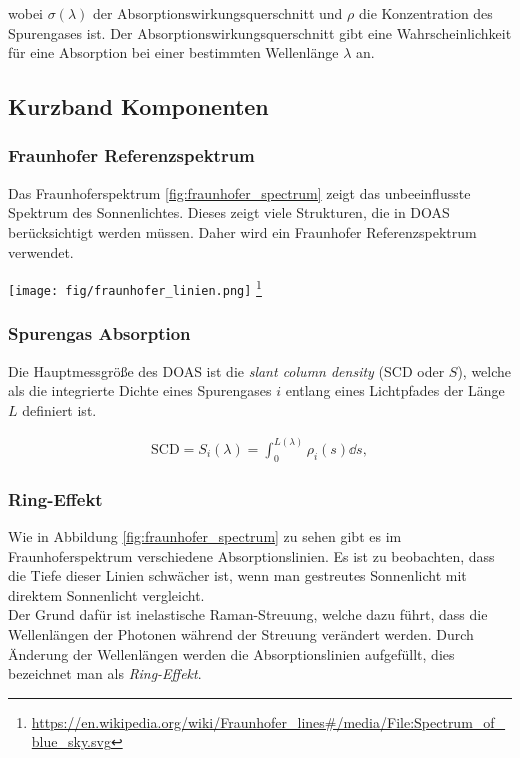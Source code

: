 \documentclass[12pt, a4paper, bibliography=totoc]{scrartcl}
\begin{document}
\begin{multicols}{2}
wobei $\sigma (\lambda)$ der Absorptionswirkungsquerschnitt und $\rho$ die Konzentration des Spurengases ist.
Der Absorptionswirkungsquerschnitt gibt eine Wahrscheinlichkeit für eine Absorption bei einer bestimmten Wellenlänge $\lambda$ an.

\subsection{Kurzband Komponenten}\label{ssec:Kurzband}

\subsubsection{Fraunhofer Referenzspektrum}\label{sssec:fraunhofer_reference}

Das Fraunhoferspektrum \ref{fig:fraunhofer_spectrum} zeigt das unbeeinflusste Spektrum des Sonnenlichtes. 
Dieses zeigt viele Strukturen, die in DOAS berücksichtigt werden müssen. 
Daher wird ein Fraunhofer Referenzspektrum verwendet.

\begin{center}
    \texttt{[image: fig/fraunhofer\_linien.png]}
    \footnote{\url{https://en.wikipedia.org/wiki/Fraunhofer_lines#/media/File:Spectrum_of_blue_sky.svg}}
    \label{fig:fraunhofer_spectrum}
\end{center}



\subsubsection{Spurengas Absorption}\label{sssec:trace_gas_absorption}

Die Hauptmessgröße des DOAS ist die \textit{slant column density} (SCD oder $S$),
welche als die integrierte Dichte eines Spurengases $i$ entlang eines Lichtpfades der Länge $L$ definiert ist.
    
\begin{align}
    \text{SCD} = S_i (\lambda) = \int_0^{L(\lambda)} \rho_i (s) \dd s ,\label{eq:SCD}
\end{align}

\subsubsection{Ring-Effekt}

Wie in Abbildung \ref{fig:fraunhofer_spectrum} zu sehen gibt es im Fraunhoferspektrum verschiedene Absorptionslinien.
Es ist zu beobachten, dass die Tiefe dieser Linien schwächer ist, wenn man gestreutes Sonnenlicht mit direktem Sonnenlicht vergleicht.\\
Der Grund dafür ist inelastische Raman-Streuung, welche dazu führt, dass die Wellenlängen der Photonen während der Streuung verändert werden.
Durch Änderung der Wellenlängen werden die Absorptionslinien aufgefüllt,
dies bezeichnet man als \textit{Ring-Effekt}.


\end{multicols}
\end{document}
